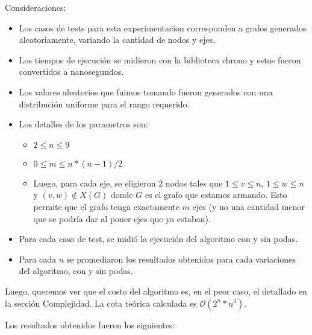 Consideraciones:
\begin{itemize}
    \item Los casos de tests para esta experimentacion corresponden a grafos generados aleatoriamente, variando la cantidad de nodos y ejes.
    \item Los tiempos de ejecución se midieron con la biblioteca chrono y estos fueron convertidos a nanosegundos.
    \item Los valores aleatorios que fuimos tomando fueron generados con una distribución uniforme para el rango requerido.
    \item Los detalles de los parametros son:
        \begin{itemize}
            \item $2 \leq n \leq 9$
            \item $0 \leq m \leq n*(n-1)/2$
            \item Luego, para cada eje, se eligieron 2 nodos tales que $1 \leq v \leq n$, $1 \leq w \leq n$ y $(v,w) \notin X(G)$ donde $G$ es el grafo que estamos armando. Esto permite que el grafo tenga exactamente $m$ ejes (y no una cantidad menor que se podría dar al poner ejes que ya estaban).
        \end{itemize}
    \item Para cada caso de test, se midió la ejecución del algoritmo con y sin podas.
    \item Para cada $n$ se promediaron los resultados obtenidos para cada variaciones del algoritmo, con y sin podas.
\end{itemize}

Luego, queremos ver que el costo del algoritmo es, en el peor caso, el detallado en la sección Complejidad. La cota teórica calculada es $\mathcal{O}(2^n*n^3)$.

Los resultados obtenidos fueron los siguientes:

